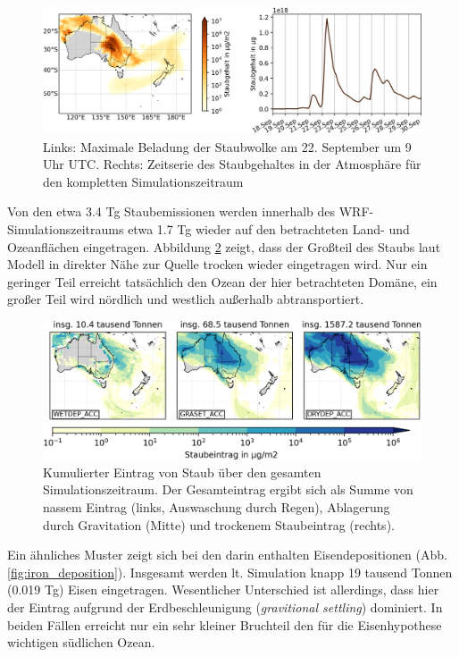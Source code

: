 \documentclass[12pt,a4paper,onecolumn,headheight=30pt]{scrartcl}
\begin{document}
\begin{figure}[htbp]
\includegraphics[width=\textwidth]{bilder/dustload_time.png}
\caption{Links: Maximale Beladung der Staubwolke am 22. September um 9 Uhr UTC. Rechts: Zeitserie des Staubgehaltes in der Atmosphäre für den kompletten Simulationszeitraum} \label{fig:dustload_time}
\end{figure}
Von den etwa 3.4 Tg Staubemissionen werden innerhalb des WRF-Simulationszeitraums etwa 1.7 Tg wieder auf den betrachteten Land- und Ozeanflächen eingetragen. Abbildung \ref{fig:deposition} zeigt, dass der Großteil des Staubs laut Modell in direkter Nähe zur Quelle trocken wieder eingetragen wird. Nur ein geringer Teil erreicht tatsächlich den Ozean der hier betrachteten Domäne, ein großer Teil wird nördlich und westlich außerhalb abtransportiert. 
\begin{figure}[htbp]
\includegraphics[width=\textwidth]{bilder/dust_deposition_vars.png}
\caption{Kumulierter Eintrag von Staub über den gesamten Simulationszeitraum. Der Gesamteintrag ergibt sich als Summe von nassem Eintrag (links, Auswaschung durch Regen), Ablagerung durch Gravitation (Mitte) und trockenem Staubeintrag (rechts).} \label{fig:deposition}
\end{figure}
Ein ähnliches Muster zeigt sich bei den darin enthalten Eisendepositionen (Abb. \ref{fig:iron_deposition}). Insgesamt werden lt. Simulation knapp 19 tausend Tonnen (0.019 Tg) Eisen eingetragen. Wesentlicher Unterschied ist allerdings, dass hier der Eintrag aufgrund der Erdbeschleunigung (\textit{gravitional settling}) dominiert. In beiden Fällen erreicht nur ein sehr kleiner Bruchteil den für die Eisenhypothese wichtigen südlichen Ozean.
\end{document}
